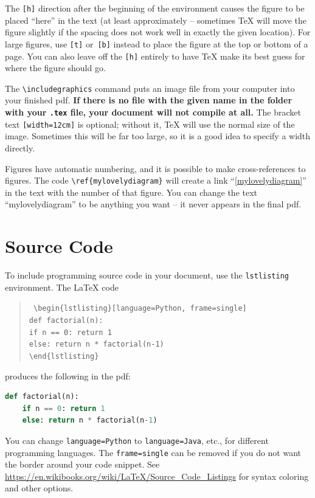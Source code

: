 \documentclass[11pt]{report}
\newcommand{\cmd}[1]{\texttt{\textbackslash{}#1}}
\begin{document}
The \texttt{[h]} direction after the beginning of the environment causes the figure to be placed ``here'' in the text (at least approximately -- sometimes \TeX{} will move the figure slightly if the spacing does not work well in exactly the given location). For large figures, use \texttt{[t]} or~\texttt{[b]} instead to place the figure at the top or bottom of a page. You can also leave off the \texttt{[h]} entirely to have \TeX{} make its best guess for where the figure should go.

The \cmd{includegraphics} command puts an image file from your computer into your finished pdf. \textbf{If there is no file with the given name in the folder with your \texttt{.tex} file, your document will not compile at all.} The bracket text \texttt{[width=12cm]} is optional; without it, \TeX{} will use the normal size of the image. Sometimes this will be far too large, so it is a good idea to specify a width directly.

Figures have automatic numbering, and it is possible to make cross-references to figures. The code \cmd{ref\{mylovelydiagram\}} will create a link ``\ref{mylovelydiagram}'' in the text with the number of that figure. You can change the text ``mylovelydiagram'' to be anything you want -- it never appears in the final pdf.

\section{Source Code}

To include programming source code in your document, use the \texttt{lstlisting} environment. The \LaTeX{} code
\begin{quote}\tt
	\textbackslash{}begin\{lstlisting\}[language=Python, frame=single] \\[-0.5em]
    \hspace*{2em}def factorial(n): \\[-0.5em]
    \hspace*{4em}if n == 0: return 1 \\[-0.5em]
    \hspace*{4em}else: return n * factorial(n-1) \\[-0.5em]
    \textbackslash{}end\{lstlisting\}
\end{quote}
produces the following in the pdf: \\
\begin{lstlisting}[language=Python, frame=single, basicstyle=\ttfamily]
def factorial(n):
	if n == 0: return 1
	else: return n * factorial(n-1)
\end{lstlisting}
You can change \texttt{language=Python} to \texttt{language=Java}, etc., for different programming languages. The \texttt{frame=single} can be removed if you do not want the border around your code snippet. See \url{https://en.wikibooks.org/wiki/LaTeX/Source_Code_Listings} for syntax coloring and other options.
\end{document}
